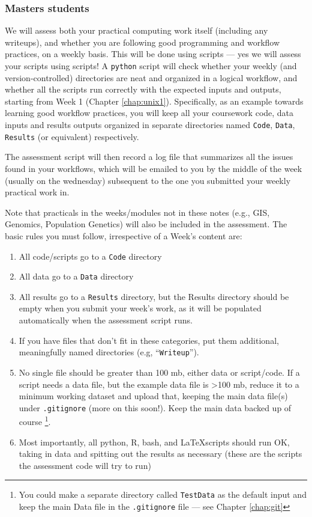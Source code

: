 \subsubsection{Masters students}

We will assess both your practical computing work itself (including any 
writeups), and whether you are following good programming and workflow 
practices, on a weekly basis. This will be done using scripts --- yes 
we will assess your scripts using scripts! A {\tt python} script will 
check whether your weekly (and version-controlled) directories are neat 
and organized in a logical workflow, and whether all the scripts run 
correctly with the expected inputs and outputs, starting from Week 1 
(Chapter \ref{chap:unix1}). Specifically, as an example towards 
learning good workflow practices, you will keep all your coursework 
code, data inputs and results outputs organized in separate directories 
named {\tt Code}, {\tt Data}, {\tt Results} (or equivalent) 
respectively. 

The assessment script will then record a log file that 
summarizes all the issues found in your workflows, which will be 
emailed to you by the middle of the week (usually on the wednesday) subsequent to the one you 
submitted your weekly practical work in. 

Note that practicals in the weeks/modules not in these notes (e.g., 
GIS, Genomics, Population Genetics) will also be included in the 
assessment. The basic rules you must follow, irrespective of a Week's 
content are: 

\begin{enumerate}
\item All code/scripts go to a {\tt Code} directory

\item All data go to a {\tt Data} directory

\item All results go to a {\tt Results} directory, but the Results 
directory should be empty when you submit your week's work, as it will 
be populated automatically when the assessment script runs.

\item If you have files that don't fit in these categories, put them 
additional, meaningfully named directories (e.g, ``{\tt Writeup}'').

\item No single file should be greater than 100 mb, either data or 
script/code. If a script needs a data file, but the example data file 
is >100 mb, reduce it to a minimum working dataset and upload that,
keeping the main data file(s) under {\tt .gitignore} (more on this 
soon!). Keep the main data backed up of course  \footnote{You could make a 
separate directory called {\tt TestData} as the default input and keep 
the main Data file in the {\tt .gitignore} file --- see Chapter \ref{chap:git}}. 

\item Most importantly, all python, R, bash, and \LaTeX scripts should 
run OK, taking in data and spitting out the results as necessary (these 
are the scripts the assessment code will try to run)

\end{enumerate}

